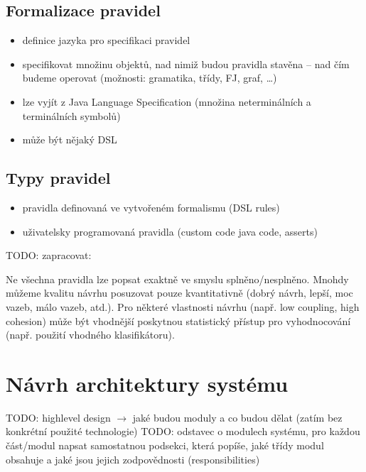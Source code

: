 
\subsection{Formalizace pravidel}

\begin{itemize}
\item definice jazyka pro specifikaci pravidel
\item specifikovat množinu objektů, nad nimiž budou pravidla stavěna -- nad čím budeme operovat (možnosti: gramatika, třídy, FJ, graf, \ldots)
\item lze vyjít z Java Language Specification (množina neterminálních a terminálních symbolů)
\item může být nějaký DSL
\end{itemize}

\subsection{Typy pravidel}
\begin{itemize}
\item pravidla definovaná ve vytvořeném formalismu (DSL rules)
\item uživatelsky programovaná pravidla (custom code java code, asserts)
\end{itemize}

TODO: zapracovat:

Ne všechna pravidla lze popsat exaktně ve smyslu splněno/nesplněno. Mnohdy můžeme kvalitu návrhu posuzovat pouze kvantitativně (dobrý návrh, lepší, moc vazeb, málo vazeb, atd.). Pro některé vlastnosti návrhu (např. low coupling, high cohesion) může být vhodnější poskytnou statistický přístup pro vyhodnocování (např. použití vhodného klasifikátoru).

\section{Návrh architektury systému}
TODO: highlevel design $\rightarrow$ jaké budou moduly a co budou dělat (zatím bez konkrétní použité technologie)
TODO: odstavec o modulech systému, pro každou část/modul napsat samostatnou podsekci, která popíše, jaké třídy modul obsahuje a jaké jsou jejich zodpovědnosti (responsibilities)

